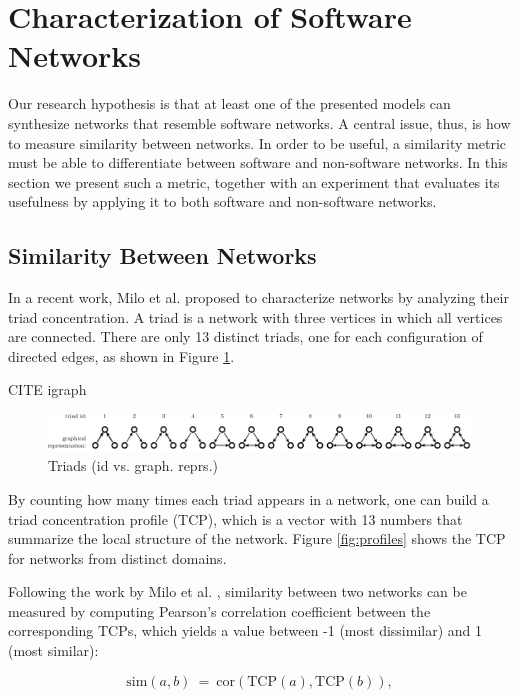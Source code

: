\section{Characterization of Software Networks}

Our research hypothesis is that at least one of the presented models can
synthesize networks that resemble software networks. A central issue, thus, is
how to measure similarity between networks. In order to be useful, a similarity
metric must be able to differentiate between software and non-software networks.
In this section we present such a metric, together with an experiment that
evaluates its usefulness by applying it to both software and non-software
networks. %

\subsection{Similarity Between Networks}

In a recent work, Milo et al. \cite{Milo2002} proposed to characterize networks
by analyzing their triad concentration. A triad is a network with three vertices
in which all vertices are connected. There are only 13 distinct triads, one for
each configuration of directed edges, as shown in Figure \ref{fig:triads}.

CITE igraph

\begin{figure}[!t]
\centering
\includegraphics[width=1.0\textwidth]{triads}
\caption{Triads (id vs. graph. reprs.)}
\label{fig:triads}
\end{figure}

By counting how many times each triad appears in a network, one can build a
triad concentration profile (TCP), which is a vector with 13 numbers that
summarize the local structure of the network. Figure \ref{fig:profiles} shows
the TCP for networks from distinct domains.

Following the work by Milo et al. \cite{Milo2004}, similarity between two
networks can be measured by computing Pearson's correlation coefficient between
the corresponding TCPs, which yields a value between -1 (most dissimilar) and 1
(most similar):

$$
\mathrm{sim}(a, b) ~=~ \mathrm{cor}(\mathrm{TCP}(a), \mathrm{TCP}(b))\mathrm{,}
$$

